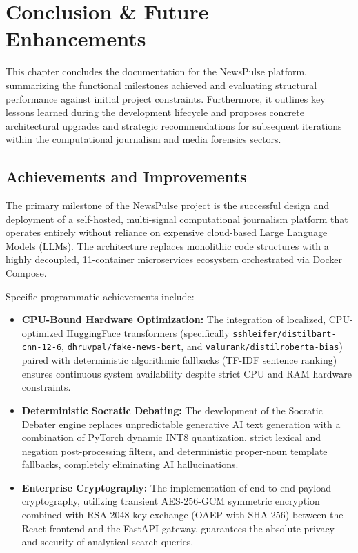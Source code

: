 \chapter{Conclusion \& Future Enhancements}
\label{ch:conclusion-future-enhancement-chapter}
\newpage

This chapter concludes the documentation for the NewsPulse platform, summarizing the functional milestones achieved and evaluating structural performance against initial project constraints. Furthermore, it outlines key lessons learned during the development lifecycle and proposes concrete architectural upgrades and strategic recommendations for subsequent iterations within the computational journalism and media forensics sectors.

\section{Achievements and Improvements}
The primary milestone of the NewsPulse project is the successful design and deployment of a self-hosted, multi-signal computational journalism platform that operates entirely without reliance on expensive cloud-based Large Language Models (LLMs). The architecture replaces monolithic code structures with a highly decoupled, 11-container microservices ecosystem orchestrated via Docker Compose.

Specific programmatic achievements include:
\begin{itemize}
    \item \textbf{CPU-Bound Hardware Optimization:} The integration of localized, CPU-optimized HuggingFace transformers (specifically \texttt{sshleifer/distilbart-cnn-12-6}, \texttt{dhruvpal/fake-news-bert}, and \texttt{valurank/distilroberta-bias}) paired with deterministic algorithmic fallbacks (TF-IDF sentence ranking) ensures continuous system availability despite strict CPU and RAM hardware constraints.
    \item \textbf{Deterministic Socratic Debating:} The development of the Socratic Debater engine replaces unpredictable generative AI text generation with a combination of PyTorch dynamic INT8 quantization, strict lexical and negation post-processing filters, and deterministic proper-noun template fallbacks, completely eliminating AI hallucinations.
    \item \textbf{Enterprise Cryptography:} The implementation of end-to-end payload cryptography, utilizing transient AES-256-GCM symmetric encryption combined with RSA-2048 key exchange (OAEP with SHA-256) between the React frontend and the FastAPI gateway, guarantees the absolute privacy and security of analytical search queries.
\end{itemize}

